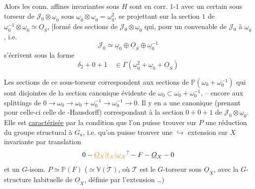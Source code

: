 Alors les conn. affines  invariantes sous $H$
sont en corr. $1$-$1$ avec un certain sous
torseur  de $\mathscr J_0\otimes\underline\omega_0$ sous $\underline\omega_0\otimes\underline\omega_0=\underline\omega_0^2$,
se projettant sur la section $1$ de $\underline\omega_0^{-1}\otimes\underline\omega_0\simeq\underline O_S$,
[formé des sections  de $\mathscr J_0\otimes\underline\omega_0$ qui, pour
un  convenable de $\mathscr J_0$  à $\underline\omega_0$,  i.e.
\[
\mathscr J_0\simeq\underline\omega_0\oplus\underline O_S\oplus\underline\omega_0^{-1}
\]
s'écrivent sous la forme
\[
\delta_2+0+1\quad\in\Gamma(\underline\omega_0^2+\underline\omega_0+\underline O_S)
\]

Les sections de ce sous-torseur correspondent
aux sections de $\mathbb P(\omega_0+\omega_0^{-1})$ qui sont disjointes
de la section canonique évidente de
$\omega_0\subset\omega_0+\omega_0^{-1}$, -- encore aux splittings
de $0\longrightarrow\omega_0\longrightarrow\omega_0+\omega_0^{-1}\longrightarrow\omega_0^{-1}\longrightarrow0$.
Il y en a une canonique (prenant pour celle-ci
celle de -Hausdorff) correspondant à la section $0+0+1$ de
$\mathscr J_0\otimes\underline\omega_0$. Elle est \uline{caractérisée}  par la condition
que  l'on puisse trouver sur
$P$ une réduction  du groupe structural
à $G_a$, i.e. qu'on puisse trouver une
$\hookrightarrow$ extension sur $X$ invariante par translation
\[
0\mathbin{-}\unsure{\underline O_X|\underline t_X|\underline\omega_X}\mathbin{-}F\mathbin{-}\underline O_X\mathbin{-}0
\]
et un $G$-isom. $P\simeq\mathbb P(F)$ ($\simeq\overline{\mathbb V(\mathcal T)}$, où $\mathcal T$ est
le $G$-torseur sous $\underline O_X$, avec la $G$-structure
habituelle de $\underline O_X$, définie par l'extension \ldots)

